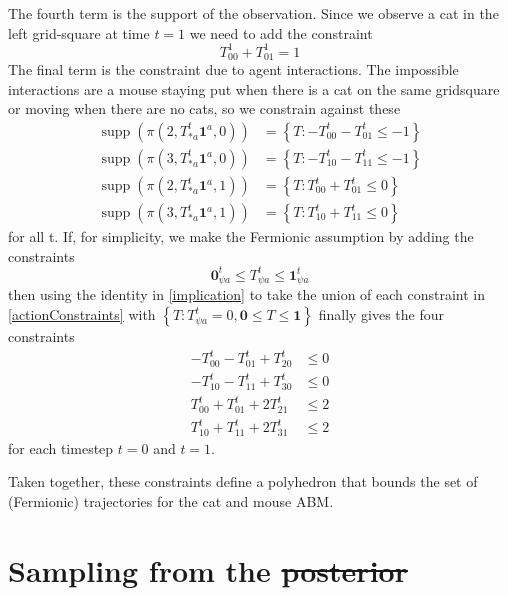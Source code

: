 \documentclass{article}
\DeclareMathOperator\supp{supp}
\providecommand{\DIFaddtex}[1]{{\protect\color{blue}\uwave{#1}}} %
\providecommand{\DIFdeltex}[1]{{\protect\color{red}\sout{#1}}}                      %
\providecommand{\DIFaddbegin}{} %
\providecommand{\DIFaddend}{} %
\providecommand{\DIFdelbegin}{} %
\providecommand{\DIFdelend}{} %
\providecommand{\DIFadd}[1]{\texorpdfstring{\DIFaddtex{#1}}{#1}} %
\providecommand{\DIFdel}[1]{\texorpdfstring{\DIFdeltex{#1}}{}} %
\newcommand{\DIFscaledelfig}{0.5}
\newlength{\DIFdelgraphicswidth} %
\newlength{\DIFdelgraphicsheight} %
\newcommand{\DIFaddincludegraphics}[2][]{{\color{blue}\fbox{\DIFOincludegraphics[#1]{#2}}}} %
\newcommand{\DIFdelincludegraphics}[2][]{%
\sbox{\DIFdelgraphicsbox}{\DIFOincludegraphics[#1]{#2}}%
\settoboxwidth{\DIFdelgraphicswidth}{\DIFdelgraphicsbox} %
\settoboxtotalheight{\DIFdelgraphicsheight}{\DIFdelgraphicsbox} %
\scalebox{\DIFscaledelfig}{%
\parbox[b]{\DIFdelgraphicswidth}{\usebox{\DIFdelgraphicsbox}\\[-\baselineskip] \rule{\DIFdelgraphicswidth}{0em}}\llap{\resizebox{\DIFdelgraphicswidth}{\DIFdelgraphicsheight}{%
\setlength{\unitlength}{\DIFdelgraphicswidth}%
\begin{picture}(1,1)%
\thicklines\linethickness{2pt} %
{\color[rgb]{1,0,0}\put(0,0){\framebox(1,1){}}}%
{\color[rgb]{1,0,0}\put(0,0){\line( 1,1){1}}}%
{\color[rgb]{1,0,0}\put(0,1){\line(1,-1){1}}}%
\end{picture}%
}\hspace*{3pt}}} %
} %
\DeclareRobustCommand{\DIFaddbegin}{\DIFOaddbegin \let\includegraphics\DIFaddincludegraphics} %
\DeclareRobustCommand{\DIFaddend}{\DIFOaddend \let\includegraphics\DIFOincludegraphics} %
\DeclareRobustCommand{\DIFdelbegin}{\DIFOdelbegin \let\includegraphics\DIFdelincludegraphics} %
\DeclareRobustCommand{\DIFdelend}{\DIFOaddend \let\includegraphics\DIFOincludegraphics} %
\begin{document}
The fourth term is the support of the observation. Since we observe a cat in the left grid-square at time $t=1$ we need to add the constraint
\[
T^1_{0 0} + T^1_{0 1} = 1
\]
The final term is the constraint due to agent interactions. The impossible interactions are a mouse staying put when there is a cat on the same gridsquare or moving when there are no cats, so we constrain against these
\begin{equation}
\begin{aligned}
\supp(\pi(2,T^t_{* a}\mathbf{1}^a,0)) &= \left\{ T: -T^t_{0 0} - T^t_{0 1} \le -1 \right\}\\
\supp(\pi(3,T^t_{* a}\mathbf{1}^a,0)) &= \left\{ T: -T^t_{1 0} - T^t_{1 1} \le -1 \right\}\\
\supp(\pi(2,T^t_{* a}\mathbf{1}^a,1)) &= \left\{ T: T^t_{0 0} + T^t_{0 1} \le 0 \right\}\\
\supp(\pi(3,T^t_{* a}\mathbf{1}^a,1)) &= \left\{ T: T^t_{1 0} + T^t_{1 1} \le 0 \right\}
\end{aligned}
\label{actionConstraints}
\end{equation}
for all t. If, for simplicity, we make the Fermionic assumption by adding the constraints
\[
\mathbf{0}^t_{\psi a} \le T^t_{\psi a} \le \mathbf{1}^t_{\psi a}
\]
then using the identity in \eqref{implication} to take the union of each constraint in \eqref{actionConstraints} with $\left\{T: T^t_{\psi a} = 0, \mathbf{0} \le T \le \mathbf{1}\right\}$ finally gives the four constraints
\[
\begin{aligned}
-T^t_{0 0} - T^t_{0 1} + T^t_{2 0} & \le 0\\
-T^t_{1 0} - T^t_{1 1} + T^t_{3 0} & \le 0\\
T^t_{0 0} + T^t_{0 1} + 2T^t_{2 1} & \le 2 \\
T^t_{1 0} + T^t_{1 1} + 2T^t_{3 1} & \le 2
\end{aligned}
\]
for each timestep $t=0$ and $t=1$.

Taken together, these constraints define a polyhedron that bounds the set of (Fermionic) trajectories for the cat and mouse ABM.

\section{Sampling from the \DIFdelbegin \DIFdel{posterior}\DIFdelend \DIFaddbegin \DIFadd{Posterior}\DIFaddend }\DIFaddbegin \label{sec:posterior_sampling}
\DIFaddend %
\end{document}
